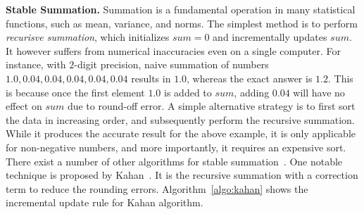 %



\textbf{Stable Summation.} Summation is a fundamental operation in many statistical functions, such as mean, variance, and norms. The simplest method is to perform {\em recurisve summation}, which initializes $sum=0$ and incrementally updates $sum$. It however suffers from numerical inaccuracies even on a single computer. For instance, with $2$-digit precision, naive summation of numbers $1.0, 0.04, 0.04, 0.04, 0.04, 0.04$ results in $1.0$, whereas the exact answer is $1.2$. This is because once the first element $1.0$ is added to $sum$, adding $0.04$ will have no effect on $sum$ due to round-off error. 
A simple alternative strategy is to first sort the data in increasing order, and subsequently perform the recursive summation. While it produces the accurate result for the above example, it is only applicable for non-negative numbers, and more importantly, it requires an expensive sort. There exist a number of other algorithms for stable summation~\cite{numStabBook}. One notable technique is proposed by Kahan~\cite{kahan1965further}. It is the recursive summation with a correction term to reduce the rounding errors. Algorithm~\ref{algo:kahan} shows the incremental update rule for Kahan algorithm.

